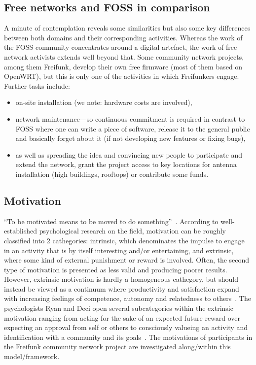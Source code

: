 \subsection{Free networks and FOSS in comparison}\label{subsec:comparison}
A minute of contemplation reveals some similarities but also some key differences between both domains and their corresponding activities. %
Whereas the work of the FOSS community concentrates around a digital artefact, the work of free network activists extends well beyond that.
Some community network projects, among them Freifunk, develop their own free firmware (most of them based on OpenWRT), but this is only one of the activities in which Freifunkers engage.
Further tasks include:
\begin{itemize}
  \item on-site installation (we note: hardware costs are involved),
  \item network maintenance---so continuous commitment is required in contrast to FOSS where one can write a piece of software, release it to the general public and basically forget about it (if not developing new features or fixing bugs),
  \item as well as spreading the idea and convincing new people to participate and extend the network, grant the project access to key locations for antenna installation (high buildings, rooftops) or contribute some funds. %
\end{itemize}

\subsection{Motivation}\label{subsec:motivation}
``To be motivated means to be moved to do something''~\cite{RyDe2000}.
According to well-established psychological research on the field, motivation can be roughly classified into 2 cathegories:
intrinsic, which denominates the impulse to engage in an activity that is by itself interesting and/or entertaining,
and extrinsic, where some kind of external punishment or reward is involved.
Often, the second type of motivation is presented as less valid and producing poorer results. %
However, extrinsic motivation is hardly a homogeneous cathegory, but should instead be viewed as a continuum where productivity and satisfaction expand with increasing feelings of competence, autonomy and relatedness to others~\cite{RyDe2000}.
The psychologists Ryan and Deci open several subcategories within the extrinsic motivation ranging from acting for the sake of an expected future reward over expecting an approval from self or others to consciously valueing an activity and identification with a community and its goals~\cite{RyDe2000}.
The motivations of participants in the Freifunk community network project are investigated along/within this model/framework.

